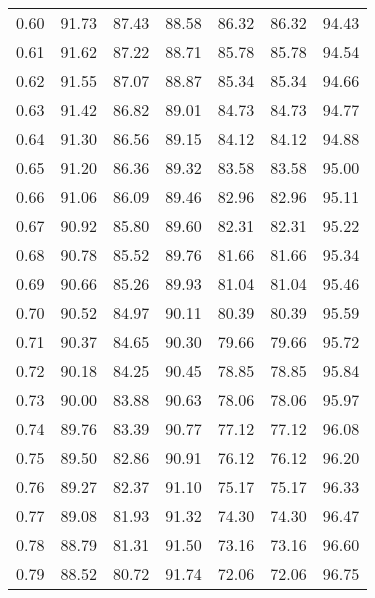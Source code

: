 \begin{tabular}{|c|c|c|c|c|c|c|}
      0.60 &     91.73 &     87.43 &      88.58 &   86.32 &      86.32 &         94.43 \\
      0.61 &     91.62 &     87.22 &      88.71 &   85.78 &      85.78 &         94.54 \\
      0.62 &     91.55 &     87.07 &      88.87 &   85.34 &      85.34 &         94.66 \\
      0.63 &     91.42 &     86.82 &      89.01 &   84.73 &      84.73 &         94.77 \\
      0.64 &     91.30 &     86.56 &      89.15 &   84.12 &      84.12 &         94.88 \\
      0.65 &     91.20 &     86.36 &      89.32 &   83.58 &      83.58 &         95.00 \\
      0.66 &     91.06 &     86.09 &      89.46 &   82.96 &      82.96 &         95.11 \\
      0.67 &     90.92 &     85.80 &      89.60 &   82.31 &      82.31 &         95.22 \\
      0.68 &     90.78 &     85.52 &      89.76 &   81.66 &      81.66 &         95.34 \\
      0.69 &     90.66 &     85.26 &      89.93 &   81.04 &      81.04 &         95.46 \\
      0.70 &     90.52 &     84.97 &      90.11 &   80.39 &      80.39 &         95.59 \\
      0.71 &     90.37 &     84.65 &      90.30 &   79.66 &      79.66 &         95.72 \\
      0.72 &     90.18 &     84.25 &      90.45 &   78.85 &      78.85 &         95.84 \\
      0.73 &     90.00 &     83.88 &      90.63 &   78.06 &      78.06 &         95.97 \\
      0.74 &     89.76 &     83.39 &      90.77 &   77.12 &      77.12 &         96.08 \\
      0.75 &     89.50 &     82.86 &      90.91 &   76.12 &      76.12 &         96.20 \\
      0.76 &     89.27 &     82.37 &      91.10 &   75.17 &      75.17 &         96.33 \\
      0.77 &     89.08 &     81.93 &      91.32 &   74.30 &      74.30 &         96.47 \\
      0.78 &     88.79 &     81.31 &      91.50 &   73.16 &      73.16 &         96.60 \\
      0.79 &     88.52 &     80.72 &      91.74 &   72.06 &      72.06 &         96.75 \\

\end{tabular}
